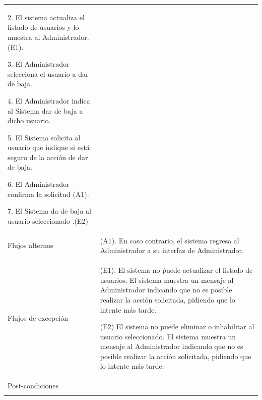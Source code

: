 \begin{longtable}{@{\extracolsep{8pt}}l p{8.5cm}}
 2. El sistema actualiza el listado de usuarios y lo muestra al Administrador.(E1). \par\vspace{.1cm}

 3. El Administrador selecciona el usuario a dar de baja. \par\vspace{.1cm}

 4. El Administrador indica al Sistema dar de baja a dicho usuario. \par\vspace{.1cm}

 5. El Sistema solicita al usuario que indique si está seguro de la acción de dar de baja. \par\vspace{.1cm}

 6. El Administrador confirma la solicitud (A1). \par\vspace{.1cm}

 7. El Sistema da de baja al usuario seleccionado .(E2) \par\vspace{.1cm}

\\

\hspace{.2cm}Flujos alternos & 
\par (A1). En caso contrario, el sistema regresa al Administrador a su interfaz de Administrador.



\\

\hspace{.2cm}Flujos de excepción & 
\par\vspace{.1cm} (E1). El sistema no ṕuede actualizar el listado de usuarios. El sistema muestra un mensaje al Administrador indicando que no es posible realizar la acción solicitada, pidiendo que lo intente más tarde.

\par\vspace{.1cm} (E2) El sistema no puede eliminar o inhabilitar al usuario seleccionado. El sistema muestra un mensaje al Administrador indicando que no es posible realizar la acción solicitada, pidiendo que lo intente más tarde.


\\%

\hspace{.2cm}Post-condiciones & 
\\
\hline

 \\
\end{longtable}
\endgroup



